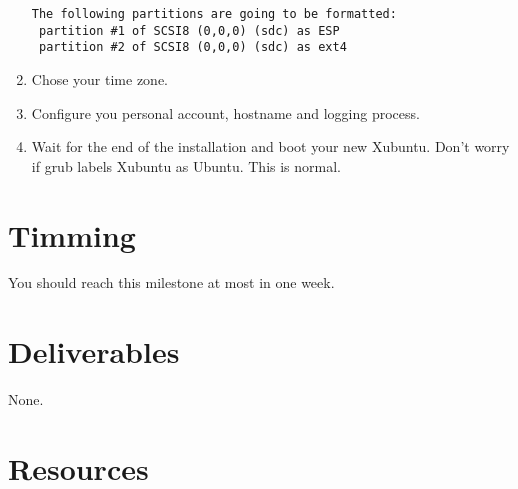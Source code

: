 \begin{enumerate}
\begin{verbatim}
The following partitions are going to be formatted:
 partition #1 of SCSI8 (0,0,0) (sdc) as ESP
 partition #2 of SCSI8 (0,0,0) (sdc) as ext4
\end{verbatim}

\item Chose your time zone.
  
\item Configure you personal account, hostname and logging process.
  
\item Wait for the end of the installation and boot your new
  Xubuntu. Don't worry if grub labels Xubuntu as Ubuntu. This is
  normal.
  
\end{enumerate}

\section{Timming}

You should reach this milestone at most in one week.

\section{Deliverables}

None.

\section{Resources}


